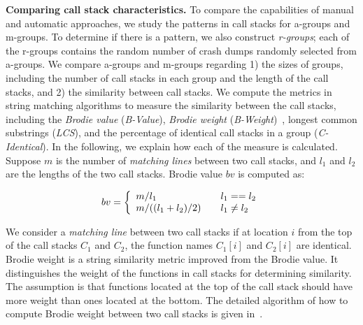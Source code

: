 \documentclass{llncs}
\begin{document}
{\bf Comparing call stack characteristics.} To compare the capabilities of manual and automatic approaches, we study the patterns in call stacks for a-groups and m-groups. To determine if there is a pattern, we also construct {\it r-groups}; each of the r-groups contains the random number of crash dumps randomly selected from a-groups. We compare a-groups and m-groups regarding 1) the sizes of groups, including the number of call stacks in each group and the length of the call stacks, and 2) the similarity between call stacks. We compute the metrics in string matching algorithms to measure the similarity between the call stacks, including the {\it Brodie value} ({\it B-Value}), {\it Brodie weight} ({\it B-Weight})~\cite{brodie:automated,brodie:quickly}, longest common substrings ({\it LCS}), and the percentage of identical call stacks in a group ({\it C-Identical}). In the following, we explain how each of the measure is calculated. Suppose $m$ is the number of {\it matching lines} between two call stacks, and $l_1$ and $l_2$ are the lengths of the two call stacks. Brodie value $bv$ is computed as:

\[
  bv = \left\{
  \begin{array}{l l}
    m/l_1 & \quad l_1 == l_2\\
    m/((l_1+l_2)/2) & \quad l_1\neq l_2\\
  \end{array} \right.
\]

We consider a {\it matching line} between two call stacks if at location $i$ from the top of the call stacks $C_1$ and $C_2$, the function names $C_1[i]$ and $C_2[i]$ are identical. Brodie weight is a string similarity metric improved from the Brodie value. It distinguishes the weight of the functions in call stacks for determining similarity. The assumption is that functions located at the top of the call stack should have more weight than ones located at the bottom. The detailed algorithm of how to compute Brodie weight between two call stacks is given in~\cite{brodie:automated}.



\end{document}

